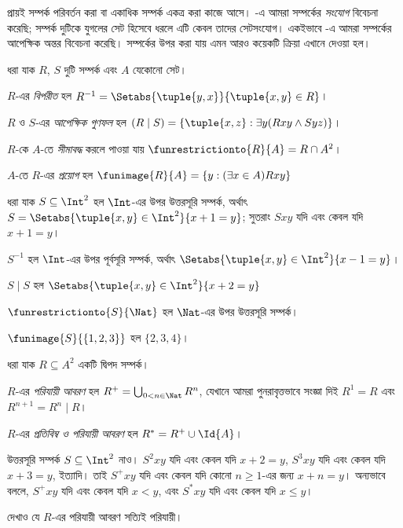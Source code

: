 \documentclass[../../../include/open-logic-section]{subfiles}
\begin{document}

প্রায়ই সম্পর্ক পরিবর্তন করা বা একাধিক সম্পর্ক একত্র করা কাজে আসে। -এ আমরা সম্পর্কের \emph{সংযোগ} বিবেচনা করেছি; সম্পর্ক দুটিকে যুগলের সেট হিসেবে ধরলে এটি কেবল তাদের সেটসংযোগ। একইভাবে -এ আমরা সম্পর্কের আপেক্ষিক অন্তর বিবেচনা করেছি। সম্পর্কের উপর করা যায় এমন আরও কয়েকটি ক্রিয়া এখানে দেওয়া হল।

\begin{defn}
ধরা যাক $R$, $S$ দুটি সম্পর্ক এবং $A$ যেকোনো সেট।

$R$-এর \emph{বিপরীত} হল $R^{-1} = \Setabs{\tuple{y, x}}{\tuple{x, y} \in R}$।

$R$ ও $S$-এর \emph{আপেক্ষিক গুণফল} হল $(R \mid S) = \{\tuple{x, z} : \exists y(Rxy \land Syz)\}$।

$R$-কে $A$-তে \emph{সীমাবদ্ধ} করলে পাওয়া যায় $\funrestrictionto{R}{A}= R \cap A^2$।

$A$-তে $R$-এর \emph{প্রয়োগ} হল $\funimage{R}{A} = \{y : (\exists x \in A)Rxy\}$
\end{defn}

\begin{ex}
ধরা যাক $S \subseteq \Int^2$ হল $\Int$-এর উপর উত্তরসূরি সম্পর্ক, অর্থাৎ $S = \Setabs{\tuple{x, y} \in \Int^2}{x + 1 = y}$; সুতরাং $Sxy$ যদি এবং কেবল যদি $x + 1 = y$।

$S^{-1}$ হল $\Int$-এর উপর পূর্বসূরি সম্পর্ক, অর্থাৎ $\Setabs{\tuple{x,y}\in\Int^2}{x -1 =y}$।

$S\mid S$ হল
$ \Setabs{\tuple{x,y}\in\Int^2}{x + 2 =y}$

$\funrestrictionto{S}{\Nat}$ হল $\Nat$-এর উপর উত্তরসূরি সম্পর্ক।

$\funimage{S}{\{1,2,3\}}$ হল $\{2, 3, 4\}$।
\end{ex}

\begin{defn}[পরিযায়ী আবরণ]ধরা যাক $R \subseteq A^2$ একটি দ্বিপদ সম্পর্ক।

$R$-এর \emph{পরিযায়ী আবরণ} হল $R^+ = \bigcup_{0 < n \in \Nat} R^n$, যেখানে আমরা পুনরাবৃত্তভাবে সংজ্ঞা দিই $R^1 = R$ এবং $R^{n+1} = R^n \mid R$।

$R$-এর \emph{প্রতিবিম্ব ও পরিযায়ী আবরণ} হল $R^* = R^+ \cup \Id{A}$।
\end{defn}

\begin{ex}
উত্তরসূরি সম্পর্ক $S \subseteq \Int^2$ নাও। $S^2xy$ যদি এবং কেবল যদি $x + 2 = y$, $S^3xy$ যদি এবং কেবল যদি $x + 3 = y$, ইত্যাদি। তাই $S^+xy$ যদি এবং কেবল যদি কোনো $n \geq 1$-এর জন্য $x + n = y$। অন্যভাবে বললে, $S^+xy$ যদি এবং কেবল যদি $x < y$, এবং $S^*xy$ যদি এবং কেবল যদি $x \le y$।
\end{ex}

\begin{prob}
দেখাও যে $R$-এর পরিযায়ী আবরণ সত্যিই পরিযায়ী।
\end{prob}
\end{document}
